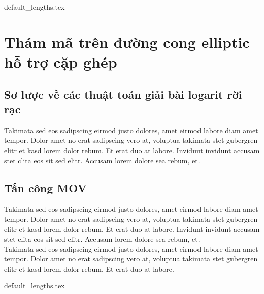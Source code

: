 \documentclass[class=report, crop=false]{standalone}
\begin{document}
	{default_lengths.tex}
	\chapter{Thám mã trên đường cong elliptic hỗ trợ cặp ghép}\label{chap:4}
	\section{Sơ lược về các thuật toán giải bài logarit rời rạc}
		Takimata sed eos sadipscing eirmod justo dolores, amet eirmod labore diam amet tempor. Dolor amet no erat sadipscing vero at, voluptua takimata stet gubergren elitr et kasd lorem dolor rebum. Et erat duo at labore. Invidunt invidunt accusam stet clita eos sit sed elitr. Accusam lorem dolore sea rebum, et.
	\section{Tấn công MOV}
		Takimata sed eos sadipscing eirmod justo dolores, amet eirmod labore diam amet tempor. Dolor amet no erat sadipscing vero at, voluptua takimata stet gubergren elitr et kasd lorem dolor rebum. Et erat duo at labore. Invidunt invidunt accusam stet clita eos sit sed elitr. Accusam lorem dolore sea rebum, et. \\
		Takimata sed eos sadipscing eirmod justo dolores, amet eirmod labore diam amet tempor. Dolor amet no erat sadipscing vero at, voluptua takimata stet gubergren elitr et kasd lorem dolor rebum. Et erat duo at labore.
	

	\newpage
	{default_lengths.tex}
\end{document}

